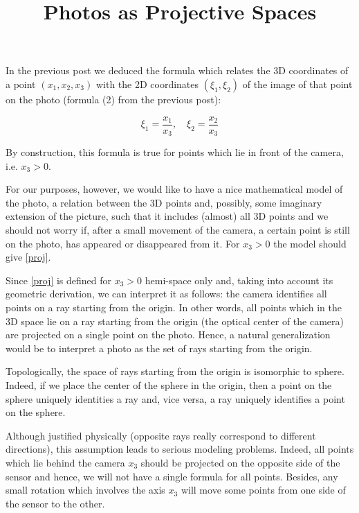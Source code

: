 \documentclass[a4paper,10pt]{article}
\title{Photos as Projective Spaces}
\author{}
\date{}
\begin{document}
\maketitle

In the previous post we deduced the formula which relates the 3D coordinates of a point $(x_1, x_2, x_3 )$ with the 2D coordinates $(\xi_1, \xi_2)$ of the image of that point on the photo (formula (2) from the previous post):

\begin{equation}
\xi_1 = \frac{x_1}{x_3}, \quad\xi_2 = \frac{x_2}{x_3}\label{proj}
\end{equation}


By construction, this formula is true for points which lie in front of the camera, i.e. $x_3>0$. 

For our purposes, however, we would like to have a nice mathematical model of the photo, a relation between the 3D points and, possibly, some imaginary extension of the picture, such that it includes (almost) all 3D points and we should not worry if, after a small movement of the camera, a certain point is still on the photo, has appeared or disappeared from it. For $x_3 > 0$ the model should give \eqref{proj}.

Since \eqref{proj} is defined for $x_3>0$ hemi-space only and, taking into account its geometric derivation, we can interpret it as follows: the camera identifies all points on a ray starting from the origin. In other words,  all points which in the 3D space lie on a ray starting from the origin (the optical center of the camera) are projected on a single point on the photo.  Hence, a natural generalization would be to interpret a photo as  the set of rays starting from the origin. 

Topologically, the space of rays starting from the origin is isomorphic to sphere. Indeed, if we place the center of the sphere in the origin, then a point on the sphere uniquely identities a ray and, vice versa, a ray uniquely identifies a point on the sphere. 

Although justified physically (opposite rays really correspond to different directions), this assumption leads to serious modeling problems. Indeed, all points which lie behind the camera $x_3$ should be projected on the opposite side of the sensor and hence, we will not have a single formula for all points. Besides, any small rotation which involves the axis $x_3$ will move some points from one side of the sensor to the other.
\end{document}
